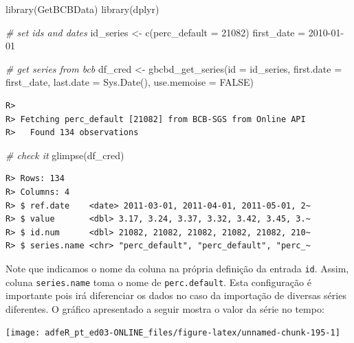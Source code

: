 \documentclass[
  11pt,
]{book}
\newenvironment{Shaded}{\begin{snugshade}}{\end{snugshade}}
\newcommand{\AttributeTok}[1]{\textcolor[rgb]{0.61,0.61,0.61}{#1}}
\newcommand{\CommentTok}[1]{\textcolor[rgb]{0.37,0.37,0.37}{\textit{#1}}}
\newcommand{\ConstantTok}[1]{\textcolor[rgb]{0,0,0}{#1}}
\newcommand{\DecValTok}[1]{\textcolor[rgb]{0.06,0.06,0.06}{#1}}
\newcommand{\FunctionTok}[1]{\textcolor[rgb]{0,0,0}{#1}}
\newcommand{\NormalTok}[1]{#1}
\newcommand{\OtherTok}[1]{\textcolor[rgb]{0.37,0.37,0.37}{#1}}
\newcommand{\StringTok}[1]{\textcolor[rgb]{0.5,0.5,0.5}{#1}}
\begin{document}
\begin{Shaded}
\begin{Highlighting}[]
\FunctionTok{library}\NormalTok{(GetBCBData)}
\FunctionTok{library}\NormalTok{(dplyr)}

\CommentTok{\# set ids and dates}
\NormalTok{id\_series }\OtherTok{\textless{}{-}} \FunctionTok{c}\NormalTok{(}\AttributeTok{perc\_default =} \DecValTok{21082}\NormalTok{)}
\NormalTok{first\_date }\OtherTok{=} \StringTok{\textquotesingle{}2010{-}01{-}01\textquotesingle{}}

\CommentTok{\# get series from bcb}
\NormalTok{df\_cred }\OtherTok{\textless{}{-}} \FunctionTok{gbcbd\_get\_series}\NormalTok{(}\AttributeTok{id =}\NormalTok{ id\_series,}
                            \AttributeTok{first.date =}\NormalTok{ first\_date,}
                            \AttributeTok{last.date =} \FunctionTok{Sys.Date}\NormalTok{(), }
                            \AttributeTok{use.memoise =} \ConstantTok{FALSE}\NormalTok{)}
\end{Highlighting}
\end{Shaded}

\begin{verbatim}
R> 
R> Fetching perc_default [21082] from BCB-SGS from Online API 
R>   Found 134 observations
\end{verbatim}

\begin{Shaded}
\begin{Highlighting}[]
\CommentTok{\# check it}
\FunctionTok{glimpse}\NormalTok{(df\_cred)}
\end{Highlighting}
\end{Shaded}

\begin{verbatim}
R> Rows: 134
R> Columns: 4
R> $ ref.date    <date> 2011-03-01, 2011-04-01, 2011-05-01, 2~
R> $ value       <dbl> 3.17, 3.24, 3.37, 3.32, 3.42, 3.45, 3.~
R> $ id.num      <dbl> 21082, 21082, 21082, 21082, 21082, 210~
R> $ series.name <chr> "perc_default", "perc_default", "perc_~
\end{verbatim}

Note que indicamos o nome da coluna na própria definição da entrada \texttt{id}. Assim, coluna \texttt{series.name} toma o nome de \texttt{perc.default}. Esta configuração é importante pois irá diferenciar os dados no caso da importação de diversas séries diferentes. O gráfico apresentado a seguir mostra o valor da série no tempo:

\begin{center}\texttt{[image: adfeR\_pt\_ed03-ONLINE\_files/figure-latex/unnamed-chunk-195-1]} \end{center}
\end{document}
